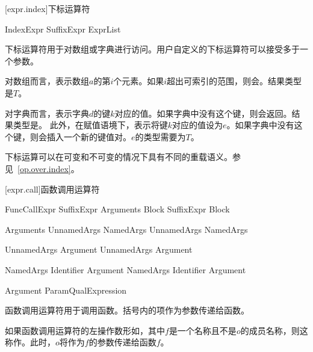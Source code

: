 [expr.index]{下标运算符}

\begin{bnf}{IndexExpr}
    SuffixExpr \terminal{[} ExprList\bnfq \terminal{]}
\end{bnf}

\pnum
下标运算符用于对数组或字典进行访问。用户自定义的下标运算符可以接受多于一个参数。

\pnum
对数组而言，表示数组$a$的第$i$个元素。如果$i$超出可索引的范围，则会。结果类型是$T$。

\pnum
对字典而言，表示字典$d$的键$k$对应的值。如果字典中没有这个键，则会返回。结果类型是。
此外，在赋值语境下，表示将键$k$对应的值设为$e$。如果字典中没有这个键，则会插入一个新的键值对。$e$的类型需要为$T$。

\pnum
下标运算可以在可变和不可变的情况下具有不同的重载语义。参见~\ref{op.over.index}。

[expr.call]{函数调用运算符}

\begin{bnf}{FuncCallExpr}
    SuffixExpr \terminal{(} Arguments\bnfq \terminal{)} Block\bnfs \br
    SuffixExpr Block
\end{bnf}

\begin{bnf}{Arguments}
    UnnamedArgs \br
    NamedArgs \br
    UnnamedArgs \terminal{,} NamedArgs
\end{bnf}

\begin{bnf}{UnnamedArgs}
    Argument \br
    UnnamedArgs \terminal{,} Argument
\end{bnf}

\begin{bnf}{NamedArgs}
    Identifier \terminal{:} Argument \br
    NamedArgs \terminal{,} Identifier \terminal{:} Argument
\end{bnf}

\begin{bnf}{Argument}
    ParamQual\bnfq Expression
\end{bnf}

\pnum
函数调用运算符用于调用函数。括号内的项作为参数传递给函数。

\pnum
如果函数调用运算符的左操作数形如，其中$f$是一个名称且不是$o$的成员名称，则这称作。此时，$o$将作为$f$的参数传递给函数$f$。

